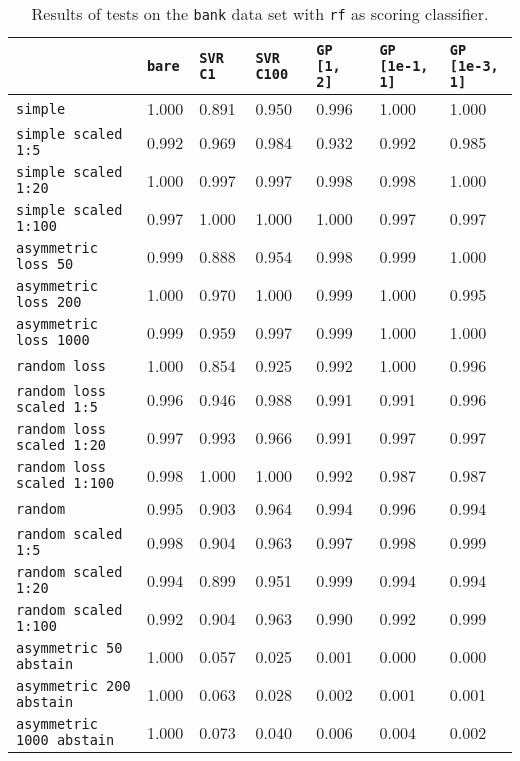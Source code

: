 \begin{table}[H]
{\scriptsize
\begin{tabu}{l|l|l|l|l|l|l}
&\texttt{bare} &\texttt{SVR C1} &\texttt{SVR C100} &\texttt{GP [1, 2]} &\texttt{GP [1e-1, 1]} &\texttt{GP [1e-3, 1]}  \\
\hline
\texttt{simple} &1.000 &0.891 &0.950 &0.996 &1.000 &1.000 \\
\texttt{simple scaled 1:5} &0.992 &0.969 &0.984 &0.932 &0.992 &0.985 \\
\texttt{simple scaled 1:20} &1.000 &0.997 &0.997 &0.998 &0.998 &1.000 \\
\texttt{simple scaled 1:100} &0.997 &1.000 &1.000 &1.000 &0.997 &0.997 \\
\texttt{asymmetric loss 50} &0.999 &0.888 &0.954 &0.998 &0.999 &1.000 \\
\texttt{asymmetric loss 200} &1.000 &0.970 &1.000 &0.999 &1.000 &0.995 \\
\texttt{asymmetric loss 1000} &0.999 &0.959 &0.997 &0.999 &1.000 &1.000 \\
\texttt{random loss} &1.000 &0.854 &0.925 &0.992 &1.000 &0.996 \\
\texttt{random loss scaled 1:5} &0.996 &0.946 &0.988 &0.991 &0.991 &0.996 \\
\texttt{random loss scaled 1:20} &0.997 &0.993 &0.966 &0.991 &0.997 &0.997 \\
\texttt{random loss scaled 1:100} &0.998 &1.000 &1.000 &0.992 &0.987 &0.987 \\
\texttt{random} &0.995 &0.903 &0.964 &0.994 &0.996 &0.994 \\
\texttt{random scaled 1:5} &0.998 &0.904 &0.963 &0.997 &0.998 &0.999 \\
\texttt{random scaled 1:20} &0.994 &0.899 &0.951 &0.999 &0.994 &0.994 \\
\texttt{random scaled 1:100} &0.992 &0.904 &0.963 &0.990 &0.992 &0.999 \\
\texttt{asymmetric 50 abstain} &1.000 &0.057 &0.025 &0.001 &0.000 &0.000 \\
\texttt{asymmetric 200 abstain} &1.000 &0.063 &0.028 &0.002 &0.001 &0.001 \\
\texttt{asymmetric 1000 abstain} &1.000 &0.073 &0.040 &0.006 &0.004 &0.002 \\
\end{tabu} }
\caption{Results of tests on the \texttt{bank} data set
         with \texttt{rf} as scoring classifier.}
\end{table}

